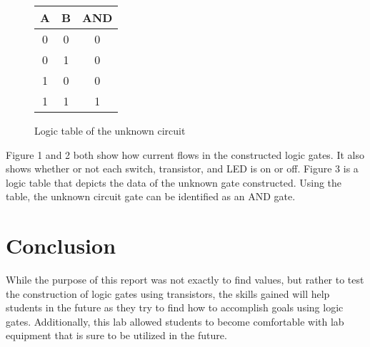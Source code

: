\documentclass[11pt]{article}
\begin{document}
\begin{figure}[ht]\centering
	\begin{tabular}{cc|c}
		\toprule
		A & B & AND \\
		\midrule
		0 & 0 & 0 \\
		0 & 1 & 0 \\
		1 & 0 & 0 \\
		1 & 1 & 1 \\
		\bottomrule
	\end{tabular} 
	
	\caption{Logic table of the unknown circuit}
	
\end{figure}
Figure 1 and 2 both show how current flows in the constructed logic gates. It also shows whether or not each switch, transistor, and LED is on or off. Figure 3 is a logic table that depicts the data of the unknown gate constructed. Using the table, the unknown circuit gate can be identified as an AND gate.
\clearpage
\section*{Conclusion}

While the purpose of this report was not exactly to find values, but rather to test the construction of logic gates using transistors, the skills gained will help students in the future as they try to find how to accomplish goals using logic gates. Additionally, this lab allowed students to become comfortable with lab equipment that is sure to be utilized in the future.
\end{document}
